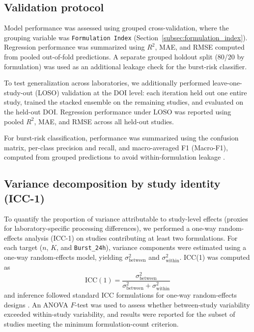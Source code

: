 \documentclass[preprint,12pt,authoryear]{elsarticle}
\begin{document}
\subsection{Validation protocol}
Model performance was assessed using grouped cross-validation, where the grouping variable was \texttt{Formulation Index} (Section~\ref{subsec:formulation_index}). Regression performance was summarized using $R^2$, MAE, and RMSE computed from pooled out-of-fold predictions. A separate grouped holdout split (80/20 by formulation) was used as an additional leakage check for the burst-risk classifier.

To test generalization across laboratories, we additionally performed leave-one-study-out (LOSO) validation at the DOI level: each iteration held out one entire study, trained the stacked ensemble on the remaining studies, and evaluated on the held-out DOI. Regression performance under LOSO was reported using pooled $R^2$, MAE, and RMSE across all held-out studies.

For burst-risk classification, performance was summarized using the confusion matrix, per-class precision and recall, and macro-averaged F1 (Macro-F1), computed from grouped predictions to avoid within-formulation leakage \citep{HeGarcia2009Imbalanced,SokolovaLapalme2009Metrics}.

\subsection{Variance decomposition by study identity (ICC-1)}
To quantify the proportion of variance attributable to study-level effects (proxies for laboratory-specific processing differences), we performed a one-way random-effects analysis (ICC-1) on studies contributing at least two formulations. For each target ($n$, $K$, and \texttt{Burst\_24h}), variance components were estimated using a one-way random-effects model, yielding $\sigma^2_{\text{between}}$ and $\sigma^2_{\text{within}}$. ICC(1) was computed as
\begin{equation}
\mathrm{ICC}(1) = \frac{\sigma^2_{\text{between}}}{\sigma^2_{\text{between}} + \sigma^2_{\text{within}}}
\end{equation}
and inference followed standard ICC formulations for one-way random-effects designs \citep{ShroutFleiss1979ICC,McGrawWong1996ICCInference}. An ANOVA $F$-test was used to assess whether between-study variability exceeded within-study variability, and results were reported for the subset of studies meeting the minimum formulation-count criterion.
\end{document}
